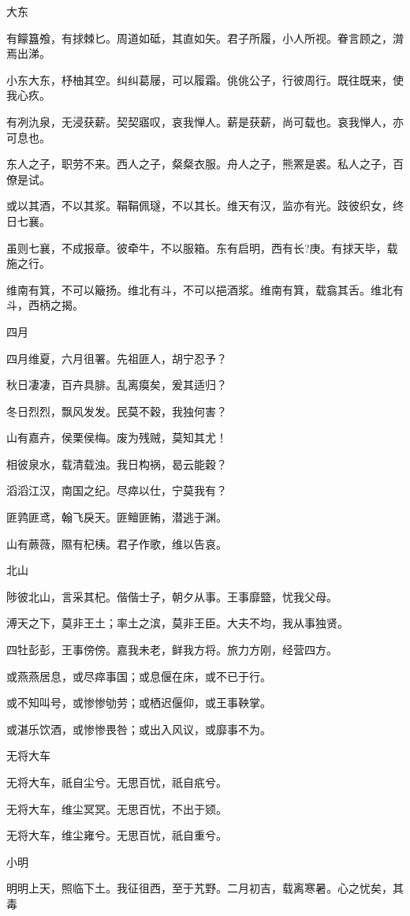 大东

有饛簋飧，有捄棘匕。周道如砥，其直如矢。君子所履，小人所视。眷言顾之，潸焉出涕。

小东大东，杼柚其空。纠纠葛屦，可以履霜。佻佻公子，行彼周行。既往既来，使我心疚。

有冽氿泉，无浸获薪。契契寤叹，哀我惮人。薪是获薪，尚可载也。哀我惮人，亦可息也。

东人之子，职劳不来。西人之子，粲粲衣服。舟人之子，熊罴是裘。私人之子，百僚是试。

或以其酒，不以其浆。鞙鞙佩璲，不以其长。维天有汉，监亦有光。跂彼织女，终日七襄。

虽则七襄，不成报章。彼牵牛，不以服箱。东有启明，西有长?庚。有捄天毕，载施之行。

维南有箕，不可以簸扬。维北有斗，不可以挹酒浆。维南有箕，载翕其舌。维北有斗，西柄之揭。

四月

四月维夏，六月徂署。先祖匪人，胡宁忍予？

秋日凄凄，百卉具腓。乱离瘼矣，爰其适归？

冬日烈烈，飘风发发。民莫不穀，我独何害？

山有嘉卉，侯栗侯梅。废为残贼，莫知其尤！

相彼泉水，载清载浊。我日构祸，曷云能穀？

滔滔江汉，南国之纪。尽瘁以仕，宁莫我有？

匪鹑匪鸢，翰飞戾天。匪鳣匪鲔，潜逃于渊。

山有蕨薇，隰有杞桋。君子作歌，维以告哀。

北山

陟彼北山，言采其杞。偕偕士子，朝夕从事。王事靡盬，忧我父母。

溥天之下，莫非王土；率土之滨，莫非王臣。大夫不均，我从事独贤。

四牡彭彭，王事傍傍。嘉我未老，鲜我方将。旅力方刚，经营四方。

或燕燕居息，或尽瘁事国；或息偃在床，或不已于行。

或不知叫号，或惨惨劬劳；或栖迟偃仰，或王事鞅掌。

或湛乐饮酒，或惨惨畏咎；或出入风议，或靡事不为。

无将大车

无将大车，祇自尘兮。无思百忧，祇自疧兮。

无将大车，维尘冥冥。无思百忧，不出于颎。

无将大车，维尘雍兮。无思百忧，祇自重兮。

小明

明明上天，照临下土。我征徂西，至于艽野。二月初吉，载离寒暑。心之忧矣，其毒

